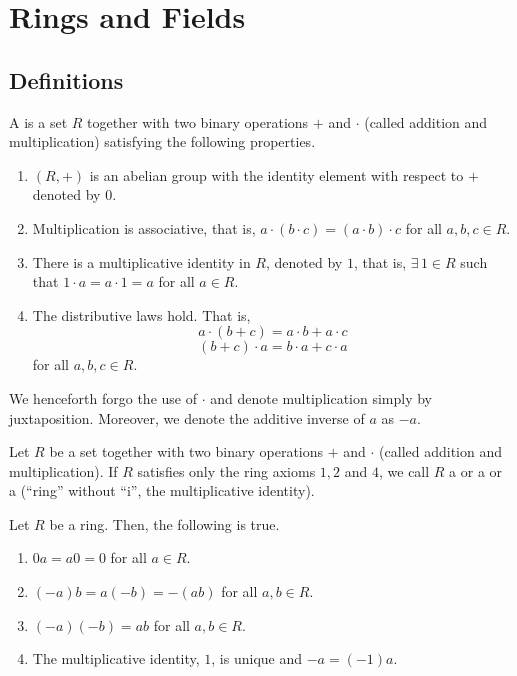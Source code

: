 \newpage
\section{Rings and Fields}

\subsection{Definitions}

\begin{defn}[Ring]
    A  is a set $R$ together with two binary operations $+$ and $\cdot$ (called addition and multiplication) satisfying the following properties.
    \begin{enumerate}
        \item $(R,+)$ is an abelian group with the identity element with respect to $+$ denoted by $0$.
        \item Multiplication is associative, that is, $a\cdot (b \cdot c) = (a \cdot b) \cdot c$ for all $a,b,c \in R$.
        \item There is a multiplicative identity in $R$, denoted by $1$, that is, $\exists \, 1 \in R$ such that $1\cdot a = a\cdot 1 = a$ for all $a \in R$.
        \item The distributive laws hold. That is,
        \[
            a\cdot (b + c) = a\cdot b + a\cdot c
        \]
        \[
            (b+c)\cdot a = b\cdot a + c\cdot a
        \]
        for all $a,b,c \in R$.
    \end{enumerate}
\end{defn}

We henceforth forgo the use of $\cdot$ and denote multiplication simply by juxtaposition. Moreover, we denote the additive inverse of $a$ as $-a$.
\begin{defn}
    Let $R$ be a set together with two binary operations $+$ and $\cdot$ (called addition and multiplication). If $R$ satisfies only the ring axioms $1,2$ and $4$, we call $R$ a  or a  or a  (``ring'' without ``i'', the multiplicative identity).
\end{defn}
\begin{prop} \label{prop:ring-basic}
    Let $R$ be a ring. Then, the following is true.
    \begin{enumerate}
        \item $0a = a0 = 0$ for all $a \in R$.
        \item $(-a)b = a(-b) = -(ab)$ for all $a,b \in R$.
        \item $(-a)(-b) = ab$ for all $a,b \in R$.
        \item The multiplicative identity, $1$, is unique and $-a = (-1)a$.
    \end{enumerate}
\end{prop}

